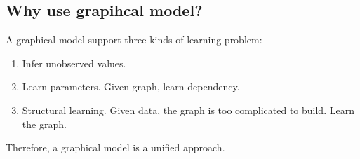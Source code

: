 \documentclass{article}
\begin{document}
\subsection{Why use grapihcal model?}

A graphical model support three kinds of learning problem:

\begin{enumerate}
\item Infer unobserved values.
\item Learn parameters.  Given graph, learn dependency.
\item Structural learning. Given data, the graph is too complicated to build. Learn the graph.
\end{enumerate}

Therefore,  a graphical model is a unified approach.
\end{document}
